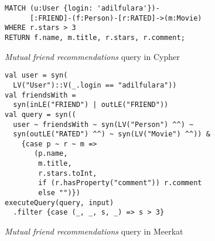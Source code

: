 \begin{figure}[!h]
\begin{lstlisting}
MATCH (u:User {login: 'adilfulara'})-
      [:FRIEND]-(f:Person)-[r:RATED]->(m:Movie)
WHERE r.stars > 3
RETURN f.name, m.title, r.stars, r.comment;
\end{lstlisting}
\caption{\emph{Mutual friend recommendations} query in Cypher}
\label{fig:Q4_C}
\end{figure}

\begin{figure}[h]
\begin{lstlisting}
val user = syn(
  LV("User")::V(_.login == "adilfulara"))
val friendsWith =
  syn(inLE("FRIEND") | outLE("FRIEND"))
val query = syn((
  user ~ friendsWith ~ syn(LV("Person") ^^) ~
  syn(outLE("RATED") ^^) ~ syn(LV("Movie") ^^)) &
    {case p ~ r ~ m =>
       (p.name,
        m.title,
        r.stars.toInt,
        if (r.hasProperty("comment")) r.comment
        else "")})
executeQuery(query, input)
  .filter {case (_, _, s, _) => s > 3}
\end{lstlisting}
\caption{\emph{Mutual friend recommendations} query in Meerkat}
\label{fig:Q4_M}
\end{figure} %



